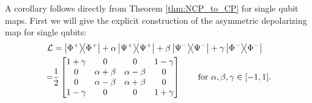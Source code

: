 \documentclass[12pt]{iopart}
\begin{document}
A corollary follows directly from Theorem \ref{thm:NCP_to_CP} for single qubit maps. First we will give the explicit construction of the asymmetric depolarizing map for single qubits:
\begin{align}
    \label{Eq:asymmetric_depolarizing_map}\mathcal{L} &= 
    \op{\Phi^+}{\Phi^+} + \alpha \op{\Psi^+}{\Psi^+} + \beta \op{\Psi^-}{\Psi^-} + \gamma \op{\Phi^-}{\Phi^-}\\ 
    =&
    \dfrac{1}{2}
    \begin{bmatrix}
    1+\gamma &0 &0 &1-\gamma\\
    0 &\alpha+\beta &\alpha-\beta &0\\
    0 &\alpha-\beta &\alpha+\beta &0\\
    1-\gamma &0 &0 &1+\gamma
    \end{bmatrix} \qquad \text{for } \alpha, \beta, \gamma \in [-1,1].
\end{align}
\end{document}
